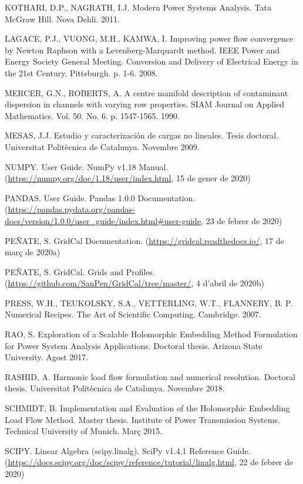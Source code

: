 KOTHARI, D.P., NAGRATH, I.J. Modern Power Systems Analysis. Tata McGraw Hill. Nova Dehli. 2011.

LAGACE, P.J., VUONG, M.H., KAMWA, I. Improving power flow convergence by Newton Raphson with a Levenberg-Marquardt method. IEEE Power and Energy Society General Meeting. Conversion and Delivery of Electrical Energy in the 21st Century. Pittsburgh. p. 1-6. 2008.

MERCER, G.N., ROBERTS, A. A centre manifold description of contaminant dispersion in channels with varying row properties. SIAM Journal on Applied Mathematics. Vol. 50. No. 6. p. 1547-1565. 1990. %

MESAS, J.J. Estudio y caracterización de cargas no lineales. Tesis doctoral. Universitat Politècnica de Catalunya. Novembre 2009.

NUMPY. User Guide. NumPy v1.18 Manual. (\url{https://numpy.org/doc/1.18/user/index.html}, 15 de gener de 2020)

PANDAS. User Guide. Pandas 1.0.0 Documentation. (\url{https://pandas.pydata.org/pandas-docs/version/1.0.0/user_guide/index.html#user-guide}, 23 de febrer de 2020)

PEÑATE, S. GridCal Documentation. (\url{https://gridcal.readthedocs.io/}, 17 de març de 2020a)

PEÑATE, S. GridCal. Grids and Profiles. (\url{https://github.com/SanPen/GridCal/tree/master/}, 4 d'abril de 2020b)

PRESS, W.H., TEUKOLSKY, S.A., VETTERLING, W.T., FLANNERY, B. P. Numerical Recipes. The Art of Scientific Computing. Cambridge. 2007. %


RAO, S. Exploration of a Scalable Holomorphic Embedding Method Formulation for Power System Analysis Applications. Doctoral thesis. Arizona State University. Agost 2017.

RASHID, A. Harmonic load flow formulation and numerical resolution. Doctoral thesis. Universitat Politècnica de Catalunya. Novembre 2018.

SCHMIDT, B. Implementation and Evaluation of the Holomorphic Embedding Load Flow Method. Master thesis. Institute of Power Transmission Systems. Technical University of Munich. Març 2015.

SCIPY. Linear Algebra (scipy.linalg). SciPy v1.4.1 Reference Guide. (\url{https://docs.scipy.org/doc/scipy/reference/tutorial/linalg.html}, 22 de febrer de 2020)

